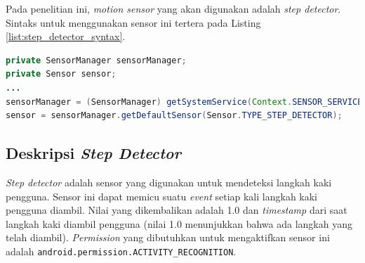 Pada penelitian ini, \textit{motion sensor} yang akan digunakan adalah \textit{step detector}. Sintaks untuk menggunakan sensor ini tertera pada Listing \ref{list:step_detector_syntax}.

\begin{lstlisting}[caption={Sintaks menggunakan sensor \textit{step detector}},label={list:step_detector_syntax},language=java]
private SensorManager sensorManager;
private Sensor sensor;
...
sensorManager = (SensorManager) getSystemService(Context.SENSOR_SERVICE);
sensor = sensorManager.getDefaultSensor(Sensor.TYPE_STEP_DETECTOR);
\end{lstlisting} 

\subsection{Deskripsi \textit{Step Detector}}
\textit{Step detector} adalah sensor yang digunakan untuk mendeteksi langkah kaki pengguna. Sensor ini dapat memicu suatu \textit{event} setiap kali langkah kaki pengguna diambil. Nilai yang dikembalikan adalah 1.0 dan \textit{timestamp} dari saat langkah kaki diambil pengguna (nilai 1.0 menunjukkan bahwa ada langkah yang telah diambil). \textit{Permission} yang dibutuhkan untuk mengaktifkan sensor ini adalah \texttt{android.permission.ACTIVITY\_RECOGNITION}. 
